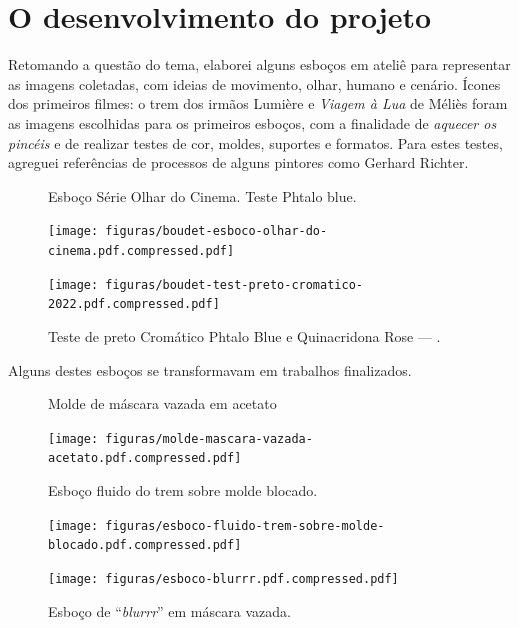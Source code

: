 \section{O desenvolvimento do projeto}%
\label{o-desenvolvimento-do-projeto}

Retomando a questão do tema, elaborei alguns esboços em ateliê para
representar as imagens coletadas, com ideias de movimento, olhar,
humano e cenário. Ícones dos primeiros filmes: o trem dos irmãos
Lumière e \emph{Viagem à Lua} de Méliès foram as imagens escolhidas
para os primeiros esboços, com a finalidade de \emph{aquecer os
	pincéis} e de realizar testes de cor, moldes, suportes e formatos. Para
estes testes, agreguei referências de processos de alguns pintores como
Gerhard Richter.

\begin{figure}
  \begin{minipage}[t]{.4\linewidth}
    \caption{Esboço Série Olhar do Cinema. Teste Phtalo blue. \phantom{aaaaaaaaaaaaaaaaaaaaaaaaaaaa}}
	\texttt{[image: figuras/boudet-esboco-olhar-do-cinema.pdf.compressed.pdf]}
\end{minipage}\hfill
\begin{minipage}[t]{.4\linewidth}
	\caption{Teste de preto Cromático
		Phtalo Blue e Quinacridona Rose --- .}

	\texttt{[image: figuras/boudet-test-preto-cromatico-2022.pdf.compressed.pdf]}
\end{minipage}
\end{figure}

Alguns destes esboços se transformavam em trabalhos finalizados.

\begin{figure}
  \begin{minipage}[t]{.3\linewidth}
	\caption{Molde de máscara vazada em acetato}

	\texttt{[image: figuras/molde-mascara-vazada-acetato.pdf.compressed.pdf]}
\end{minipage}
\begin{minipage}[t]{.3\linewidth}
	\caption{Esboço fluido do trem sobre molde blocado.}

	\texttt{[image: figuras/esboco-fluido-trem-sobre-molde-blocado.pdf.compressed.pdf]}
\end{minipage}
  \begin{minipage}[t]{.3\linewidth}
	\caption{Esboço de \enquote{\emph{blurrr}} em máscara vazada.}

	\texttt{[image: figuras/esboco-blurrr.pdf.compressed.pdf]}
\end{minipage}
\end{figure}


